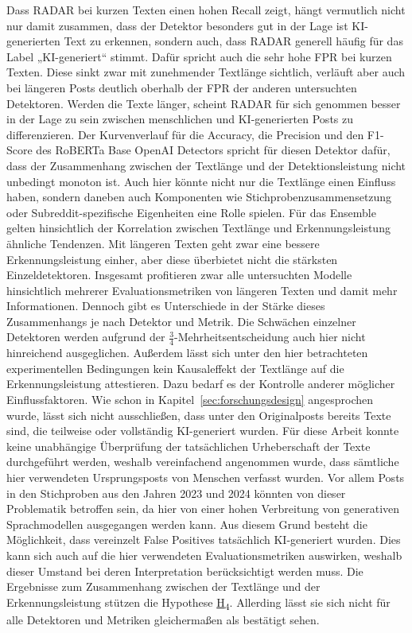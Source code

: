 Dass RADAR bei kurzen Texten einen hohen Recall zeigt, hängt vermutlich nicht nur damit zusammen, dass der Detektor besonders gut in der Lage ist KI-generierten Text zu erkennen, sondern auch, dass RADAR generell häufig für das Label „KI-generiert“ stimmt. Dafür spricht auch die sehr hohe FPR bei kurzen Texten. Diese sinkt zwar mit zunehmender Textlänge sichtlich, verläuft aber auch bei längeren Posts deutlich oberhalb der FPR der anderen untersuchten Detektoren. Werden die Texte länger, scheint RADAR für sich genommen besser in der Lage zu sein zwischen menschlichen und KI-generierten Posts zu differenzieren. Der Kurvenverlauf für die Accuracy, die Precision und den F1-Score des RoBERTa Base OpenAI Detectors spricht für diesen Detektor dafür, dass der Zusammenhang zwischen der Textlänge und der Detektionsleistung nicht unbedingt monoton ist. Auch hier könnte nicht nur die Textlänge einen Einfluss haben, sondern daneben auch Komponenten wie Stichprobenzusammensetzung oder Subreddit-spezifische Eigenheiten eine Rolle spielen. Für das Ensemble gelten hinsichtlich der Korrelation zwischen Textlänge und Erkennungsleistung ähnliche Tendenzen. Mit längeren Texten geht zwar eine bessere Erkennungsleistung einher, aber diese überbietet nicht die stärksten Einzeldetektoren. Insgesamt profitieren zwar alle untersuchten Modelle hinsichtlich mehrerer Evaluationsmetriken von längeren Texten und damit mehr Informationen. Dennoch gibt es Unterschiede in der Stärke dieses Zusammenhangs je nach Detektor und Metrik. Die Schwächen einzelner Detektoren werden aufgrund der \(\frac{3}{4}\)-Mehrheitsentscheidung auch hier nicht hinreichend ausgeglichen. Außerdem lässt sich unter den hier betrachteten experimentellen Bedingungen kein Kausaleffekt der Textlänge auf die Erkennungsleistung attestieren. Dazu bedarf es der Kontrolle anderer möglicher Einflussfaktoren. Wie schon in Kapitel~\ref{sec:forschungsdesign} angesprochen wurde, lässt sich nicht ausschließen, dass unter den Originalposts bereits Texte sind, die teilweise oder vollständig KI-generiert wurden. Für diese Arbeit konnte keine unabhängige Überprüfung der tatsächlichen Urheberschaft der Texte durchgeführt werden, weshalb vereinfachend angenommen wurde, dass sämtliche hier verwendeten Ursprungsposts von Menschen verfasst wurden. Vor allem Posts in den Stichproben aus den Jahren 2023 und 2024 könnten von dieser Problematik betroffen sein, da hier von einer hohen Verbreitung von generativen Sprachmodellen ausgegangen werden kann. Aus diesem Grund besteht die Möglichkeit, dass vereinzelt False Positives tatsächlich KI-generiert wurden. Dies kann sich auch auf die hier verwendeten Evaluationsmetriken auswirken, weshalb dieser Umstand bei deren Interpretation berücksichtigt werden muss. Die Ergebnisse zum Zusammenhang zwischen der Textlänge und der Erkennungsleistung stützen die Hypothese \hyperlink{hp:4}{H\textsubscript{4}}. Allerding lässt sie sich nicht für alle Detektoren und Metriken gleichermaßen als bestätigt sehen.
